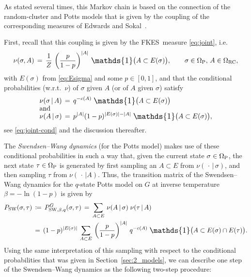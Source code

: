 \documentclass{dis}
\theoremstyle{citing}
\begin{document}
As stated several times, this Markov chain 
is based on the connection of the random-cluster and Potts models 
that is given by the coupling of the corresponding measures 
of Edwards and Sokal~\cite{ES}. 

First, recall that this coupling is given by the {FKES}\ measure 
\eqref{eq:joint}, i.e. 
\[
\nu(\sigma,A)\,=\,\frac{1}{Z}\,
	\left(\frac{p}{1-p}\right)^{{\left\vert {A} \right\vert}}\,
	{\scalebox{1.2}{\raisebox{-0.2mm}{$\mathds{1}$}}}\bigl(A\subset E(\sigma)\bigr), \qquad \sigma\in{{\Omega}_{\rm P}},\, A\in{{\Omega}_{\rm RC}}, 
\]
with $E(\sigma)$ from \eqref{eq:Esigma} and some $p\in[0,1]$, 
and that the 
conditional probabilities (w.r.t.~$\nu$) of $\sigma$ given $A$ 
(or of $A$ given $\sigma$) satisfy
\begin{align} \label{eq:joint-cond-1}
\nu(\sigma \,|\, A) \,&=\, q^{-c(A)}\;
	{\scalebox{1.2}{\raisebox{-0.2mm}{$\mathds{1}$}}}\bigl(A\subset E(\sigma)\bigr)\\[-2mm]
\shortintertext{and \vspace*{-2mm}} \label{eq:joint-cond-2} 
\nu(A \,|\, \sigma) \,&=\, p^{{\left\vert {A} \right\vert}} 
	(1-p)^{{\left\vert {E(\sigma)} \right\vert}-{\left\vert {A} \right\vert}}\;
	{\scalebox{1.2}{\raisebox{-0.2mm}{$\mathds{1}$}}}\bigl(A\subset E(\sigma)\bigr),
\end{align}
see \eqref{eq:joint-cond} and the discussion thereafter.

The \emph{Swendsen--Wang dynamics} 
(for the Potts model) 
makes use of these conditional probabilities in such a way that, 
given the current state $\sigma\in{{\Omega}_{\rm P}}$, the next state $\tau\in{{\Omega}_{\rm P}}$ 
is generated by first sampling an $A\subset E$ from 
$\nu(\,\cdot \,|\, \sigma)$, and then sampling $\tau$ from 
$\nu(\,\cdot\, | A)$. Thus, the transition matrix of the 
Swendsen--Wang dynamics for the $q$-state Potts model 
on $G$ at inverse temperature $\beta=-\ln(1-p)$ is given by
\begin{equation} \label{eq:SW-P}
\begin{split}
{P_{\rm SW}}(\sigma,\tau) \,&\coloneqq\, P_{{\rm SW},\beta,q}^G(\sigma,\tau) 
\,=\, \sum_{A\subset E}\, \nu(A \,|\, \sigma)\; \nu(\tau \,|\, A) \\
&=\,(1-p)^{{\left\vert {E(\sigma)} \right\vert}}\,\sum_{A\subset E} 
	\,\left(\frac{p}{1-p}\right)^{{\left\vert {A} \right\vert}}\, q^{-c(A)}\; 
	{\scalebox{1.2}{\raisebox{-0.2mm}{$\mathds{1}$}}}\bigl(A\subset E(\sigma)\cap E(\tau)\bigr).
\end{split}\end{equation}
Using the same interpretation of this sampling with respect to the 
conditional probabilities that was given in 
Section~\ref{sec:2_models}, 
we can describe one step of the Swendsen--Wang dynamics as the 
following two-step procedure:
\end{document}
